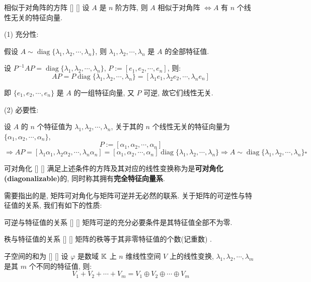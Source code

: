 \documentclass[UTF8]{ctexart}
\DeclareMathOperator{\0}{\mathbf{0}}
\DeclareMathOperator{\<}{\langle}
\renewcommand{\>}{\rangle}
\DeclareMathOperator{\diag}{diag}
\begin{document}
		\begin{thm}
			[]
			{相似于对角阵的方阵}
			[]
			[]
			设 \(A\) 是 \(n\) 阶方阵, 则 \(A\) 相似于对角阵 \(\iff A\) 有 \(n\) 个线性无关的特征向量. 
		\end{thm}

        \begin{prf}

			(1) 充分性: 
			
			假设 \(A\sim\diag\{\lambda_1,\lambda_2,\cdots,\lambda_n\}\), 则 \(\lambda_1,\lambda_2,\cdots,\lambda_n\) 是 \(A\) 的全部特征值. 

			设 \(P^{-1}AP=\diag\{\lambda_1,\lambda_2,\cdots,\lambda_n\}\),  \(P:=[e_1,e_2,\cdots,e_n]\), 则: 
			\[AP=P\diag\{\lambda_1,\lambda_2,\cdots,\lambda_n\}=[\lambda_1 e_1,\lambda_2 e_2,\cdots,\lambda_n e_n]\]

			即 \(\{e_1,e_2,\cdots,e_n\}\) 是 \(A\) 的一组特征向量, 又 \(P\) 可逆, 故它们线性无关. 

			(2) 必要性: 
			
			设 \(A\) 的 \(n\) 个特征值为 \(\lambda_1,\lambda_2,\cdots,\lambda_n\), 关于其的 \(n\) 个线性无关的特征向量为 \(\{\alpha_1,\alpha_2,\cdots,\alpha_n\}\), 
			\[P:=[\alpha_1,\alpha_2,\cdots,\alpha_n]\]
			\[\Longrightarrow AP=[\lambda_1\alpha_1,\lambda_2\alpha_2,\cdots,\lambda_n\alpha_n]=[\alpha_1,\alpha_2,\cdots,\alpha_n]\diag\{\lambda_1,\lambda_2,\cdots,\lambda_n\}\Longrightarrow A\sim\diag\{\lambda_1,\lambda_2,\cdots,\lambda_n\}\square\]
        \end{prf}
		
		\begin{dfn}
			[]
			{可对角化}
			[]
			[]
			满足上述条件的方阵及其对应的线性变换称为是\textbf{可对角化(diagonalizable)}的, 同时称其拥有\textbf{完全特征向量系}. 
		\end{dfn}

		需要指出的是, 矩阵可对角化与矩阵可逆并无必然的联系. 关于矩阵的可逆性与特征值的关系, 我们有如下的性质: 

		\begin{ppt}
			[]
			{可逆与特征值的关系}
			[]
			[]
			矩阵可逆的充分必要条件是其特征值全部不为零. 
		\end{ppt}

		\begin{ppt}
			[]
			{秩与特征值的关系}
			[]
			[]
			矩阵的秩等于其非零特征值的个数(记重数) . 
		\end{ppt}
		
		\begin{thm}
			[]
			{子空间的和为}
			[]
			[]
			设 \(\varphi\) 是数域 \(\operatorname{\mathbb{K}}\) 上 \(n\) 维线性空间 \(V\) 上的线性变换,  \(\lambda_1,\lambda_2,\cdots,\lambda_m\) 是其 \(m\) 个不同的特征值, 则: 
			\[V_1+V_2+\cdots+V_m=V_1\oplus V_2\oplus\cdots\oplus V_m\]
		\end{thm}
\end{document}
